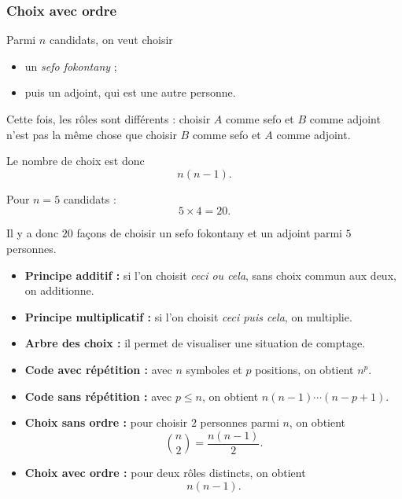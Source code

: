 \documentclass[11pt]{article}
\begin{document}
\subsubsection*{Choix avec ordre}

\begin{exemple}
Parmi \(n\) candidats, on veut choisir
\begin{itemize}
    \item un \emph{sefo fokontany} ;
    \item puis un adjoint, qui est une autre personne.
\end{itemize}
\end{exemple}

\begin{solution}
Cette fois, les rôles sont différents :
choisir \(A\) comme sefo et \(B\) comme adjoint
n’est pas la même chose que choisir \(B\) comme sefo et \(A\) comme adjoint.

Le nombre de choix est donc
\[
n(n-1).
\]
\end{solution}

\begin{exemple}
Pour \(n=5\) candidats :
\[
5\times 4=20.
\]

Il y a donc \(\boxed{20}\) façons de choisir un sefo fokontany et un adjoint parmi \(5\) personnes.
\end{exemple}

\begin{retenir}
\begin{itemize}
    \item \textbf{Principe additif :} si l’on choisit \emph{ceci ou cela}, sans choix commun aux deux, on additionne.
    \item \textbf{Principe multiplicatif :} si l’on choisit \emph{ceci puis cela}, on multiplie.
    \item \textbf{Arbre des choix :} il permet de visualiser une situation de comptage.
    \item \textbf{Code avec répétition :} avec \(n\) symboles et \(p\) positions, on obtient \(n^p\).
    \item \textbf{Code sans répétition :} avec \(p\le n\), on obtient \(n(n-1)\cdots(n-p+1)\).
    \item \textbf{Choix sans ordre :} pour choisir \(2\) personnes parmi \(n\), on obtient
    \[
    \binom{n}{2}=\frac{n(n-1)}{2}.
    \]
    \item \textbf{Choix avec ordre :} pour deux rôles distincts, on obtient
    \[
    n(n-1).
    \]
\end{itemize}
\end{retenir}
\end{document}
